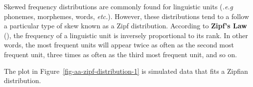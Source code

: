 \documentclass[
  letterpaper,
]{latex/krantz}
\theoremstyle{definition}
\theoremstyle{remark}
\begin{document}
Skewed frequency distributions are commonly found for linguistic units
(\emph{.e.g} phonemes, morphemes, words, \emph{etc.}). However, these
distributions tend to a follow a particular type of skew known as a Zipf
distribution. According to \textbf{Zipf's Law}
(), the frequency of a linguistic unit
is inversely proportional to its rank. In other words, the most frequent
units will appear twice as often as the second most frequent unit, three
times as often as the third most frequent unit, and so on.

The plot in Figure~\ref{fig-aa-zipf-distribution-1} is simulated data
that fits a Zipfian distribution.

\begin{figure}[H]

\begin{minipage}{0.50\linewidth}



\end{minipage}%
%
\begin{minipage}{0.50\linewidth}


\end{minipage}
\end{figure}
\end{document}
